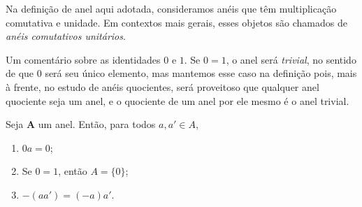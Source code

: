 Na definição de anel aqui adotada, consideramos anéis que têm multiplicação comutativa e unidade. Em contextos mais gerais, esses objetos são chamados de \emph{anéis comutativos unitários}.

Um comentário sobre as identidades $0$ e $1$. Se $0=1$, o anel será \emph{trivial}, no sentido de que $0$ será seu único elemento, mas mantemos esse caso na definição pois, mais à frente, no estudo de anéis quocientes, será proveitoso que qualquer anel quociente seja um anel, e o quociente de um anel por ele mesmo é o anel trivial.


\begin{proposition}
Seja $\bm A$ um anel. Então, para todos $a,a' \in A$,
	\begin{enumerate}
	\item $0a = 0$;
	\item Se $0=1$, então $A=\{0\}$;
	\item $-(aa') = (-a)a'$.
	\end{enumerate}
\end{proposition}
